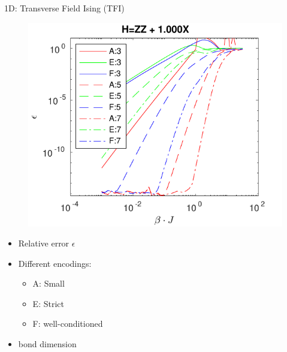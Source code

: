 \begin{frame}{1D: Transverse Field Ising (TFI) }

    \begin{minipage}{.6\textwidth}
        \begin{figure}
            \center
            \includegraphics[height=0.9\textheight]{../Figuren/benchmarking/t_ising_small.pdf}
        \end{figure}
    \end{minipage}
    \begin{minipage}{.39\textwidth}

        \begin{itemize}
            \item Relative error $\epsilon$
            \item Different encodings:
                  \begin{itemize}
                      \item A: Small
                      \item E: Strict
                      \item F: well-conditioned
                  \end{itemize}

            \item bond dimension


\end{itemize}
\end{minipage}
\end{frame}
